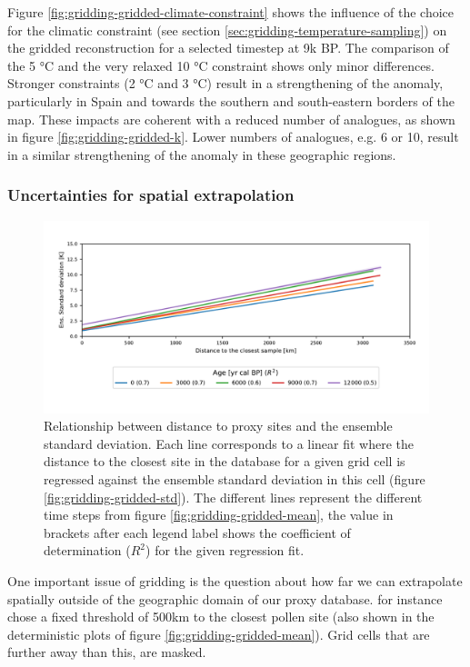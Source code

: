 \documentclass[
11pt, %
english, %
singlespacing, %
headsepline, %
]{MastersDoctoralThesis} %
\begin{document}
\begin{NoHyper}
\begin{refsection}
Figure \ref{fig:gridding-gridded-climate-constraint} shows the influence of the choice for the climatic constraint (see section \ref{sec:gridding-temperature-sampling}) on the gridded reconstruction for a selected timestep at 9k BP. The comparison of the 5 °C and the very relaxed 10 °C constraint shows only minor differences. Stronger constraints (2 °C and 3 °C) result in a strengthening of the anomaly, particularly in Spain and towards the southern and south-eastern borders of the map. These impacts are coherent with a reduced number of analogues, as shown in figure \ref{fig:gridding-gridded-k}. Lower numbers of analogues, e.g. 6 or 10, result in a similar strengthening of the anomaly in these geographic regions.


\subsubsection{Uncertainties for spatial extrapolation}

\begin{figure}
	\includegraphics[width=\linewidth]{gridding-figures/distance-std-relation.pdf}
	\caption[Relationship between distance to proxy sites and ensemble standard deviation]{Relationship between distance to proxy sites and the ensemble standard deviation. Each line corresponds to a linear fit where the distance to the closest site in the database for a given grid cell is regressed against the ensemble standard deviation in this cell (figure \ref{fig:gridding-gridded-std}). The different lines represent the different time steps from figure \ref{fig:gridding-gridded-mean}, the value in brackets after each legend label shows the coefficient of determination ($R^2$) for the given regression fit.}
	\label{fig:gridding-dist-std}
\end{figure}

One important issue of gridding is the question about how far we can extrapolate spatially outside of the geographic domain of our proxy database. \cite{MauriDavisCollinsEtAl2015} for instance chose a fixed threshold of 500km to the closest pollen site (also shown in the deterministic plots of figure \ref{fig:gridding-gridded-mean}). Grid cells that are further away than this, are masked.


\end{refsection}
\end{NoHyper}
\end{document}
